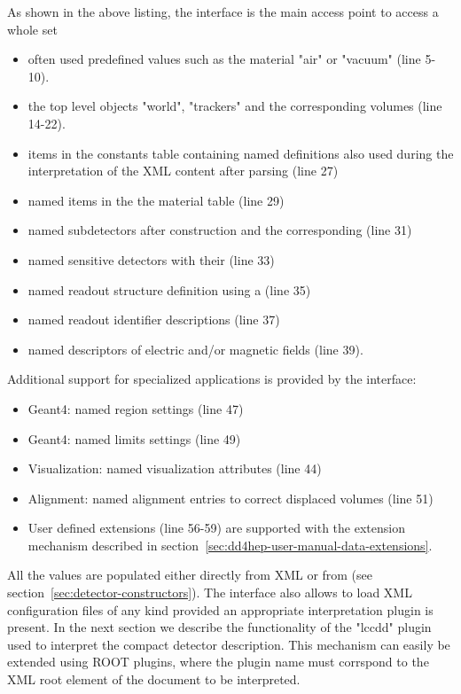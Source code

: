 \documentclass[10pt,a4paper]{article}
\begin{document}
\noindent
As shown in the above listing, the  interface is the main access point to access
a whole set 
\begin{itemize}\itemcompact
\item often used predefined values such as the material "air" or "vacuum" (line 5-10).
\item the top level objects "world", "trackers" and the corresponding volumes (line 14-22).
\item items in the constants table containing named definitions also used during the
  interpretation of the XML content after parsing (line 27)
\item named items in the the material table (line 29)
\item named subdetectors after construction and the corresponding (line 31)
\item named sensitive detectors with their (line 33)
\item named readout structure definition using a (line 35)
\item named readout identifier descriptions (line 37)
\item named descriptors of electric and/or magnetic fields  (line 39).
\end{itemize}
Additional support for specialized applications is provided by the interface:
\begin{itemize}\itemcompact
\item Geant4: named region settings  (line 47)
\item Geant4: named limits settings  (line 49)
\item Visualization: named visualization attributes  (line 44)
\item Alignment: named alignment entries to correct displaced volumes  (line 51)
\item User defined extensions (line 56-59) are supported with the extension mechanism 
    described in section~\ref{sec:dd4hep-user-manual-data-extensions}.
\end{itemize}
All the values are populated either directly from XML or from
 (see section~\ref{sec:detector-constructors}). The interface
also allows to load XML configuration files of any kind provided an appropriate 
interpretation plugin is present. In the next section we describe the functionality 
of the "lccdd" plugin used to interpret the compact detector description.
This mechanism can easily be extended using ROOT plugins, where the 
plugin name must corrspond to the XML root element of the document to 
be interpreted.
\end{document}
